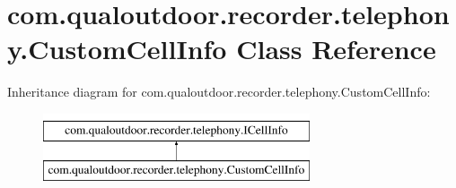 \hypertarget{classcom_1_1qualoutdoor_1_1recorder_1_1telephony_1_1CustomCellInfo}{\section{com.\-qualoutdoor.\-recorder.\-telephony.\-Custom\-Cell\-Info Class Reference}
\label{classcom_1_1qualoutdoor_1_1recorder_1_1telephony_1_1CustomCellInfo}
}
Inheritance diagram for com.\-qualoutdoor.\-recorder.\-telephony.\-Custom\-Cell\-Info\-:\begin{figure}[H]
\begin{center}
\leavevmode
\includegraphics[height=2.000000cm]{classcom_1_1qualoutdoor_1_1recorder_1_1telephony_1_1CustomCellInfo}
\end{center}
\end{figure}
